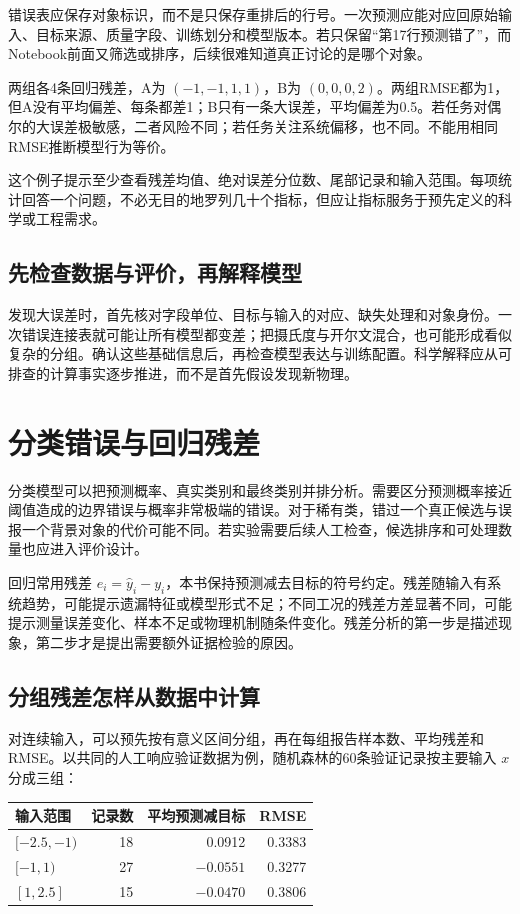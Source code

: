 错误表应保存对象标识，而不是只保存重排后的行号。一次预测应能对应回原始输入、目标来源、质量字段、训练划分和模型版本。若只保留“第17行预测错了”，而Notebook前面又筛选或排序，后续很难知道真正讨论的是哪个对象。

两组各4条回归残差，A为 $(-1,-1,1,1)$，B为 $(0,0,0,2)$。两组RMSE都为1，但A没有平均偏差、每条都差1；B只有一条大误差，平均偏差为0.5。若任务对偶尔的大误差极敏感，二者风险不同；若任务关注系统偏移，也不同。不能用相同RMSE推断模型行为等价。

这个例子提示至少查看残差均值、绝对误差分位数、尾部记录和输入范围。每项统计回答一个问题，不必无目的地罗列几十个指标，但应让指标服务于预先定义的科学或工程需求。

\subsection{先检查数据与评价，再解释模型}
发现大误差时，首先核对字段单位、目标与输入的对应、缺失处理和对象身份。一次错误连接表就可能让所有模型都变差；把摄氏度与开尔文混合，也可能形成看似复杂的分组。确认这些基础信息后，再检查模型表达与训练配置。科学解释应从可排查的计算事实逐步推进，而不是首先假设发现新物理。

\section{分类错误与回归残差}
分类模型可以把预测概率、真实类别和最终类别并排分析。需要区分预测概率接近阈值造成的边界错误与概率非常极端的错误。对于稀有类，错过一个真正候选与误报一个背景对象的代价可能不同。若实验需要后续人工检查，候选排序和可处理数量也应进入评价设计。

回归常用残差 $e_i=\hat y_i-y_i$，本书保持预测减去目标的符号约定。残差随输入有系统趋势，可能提示遗漏特征或模型形式不足；不同工况的残差方差显著不同，可能提示测量误差变化、样本不足或物理机制随条件变化。残差分析的第一步是描述现象，第二步才是提出需要额外证据检验的原因。

\subsection{分组残差怎样从数据中计算}
对连续输入，可以预先按有意义区间分组，再在每组报告样本数、平均残差和RMSE。以共同的人工响应验证数据为例，随机森林的60条验证记录按主要输入 $x$ 分成三组：
\begin{center}\small
\begin{tabular}{lrrr}\toprule
输入范围&记录数&平均预测减目标&RMSE\\\midrule
$[-2.5,-1)$&18&0.0912&0.3383\\
$[-1,1)$&27&$-0.0551$&0.3277\\
$[1,2.5]$&15&$-0.0470$&0.3806\\\bottomrule
\end{tabular}\end{center}

